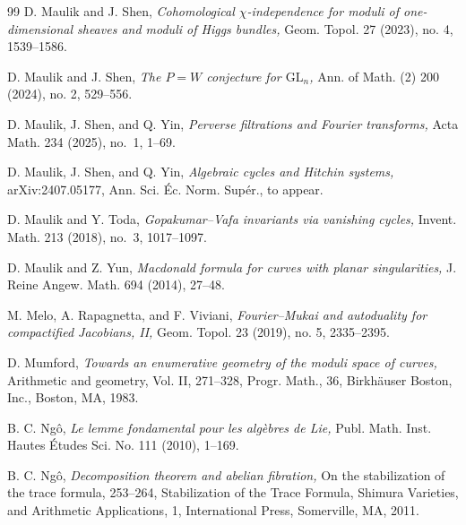 \documentclass[11pt]{amsart}
\theoremstyle{plain}
\theoremstyle{definition}
\theoremstyle{remark}
\begin{document}
\begin{thebibliography}{99}
 D. Maulik and J. Shen, {\em Cohomological $\chi$-independence for moduli of one-dimensional sheaves and moduli of Higgs bundles,} Geom. Topol. 27 (2023), no. 4, 1539--1586.

 D. Maulik and J. Shen, {\em The $P=W$ conjecture for $\mathrm{GL}_n$,} Ann. of Math. (2) 200 (2024), no. 2, 529--556.

 D. Maulik, J. Shen, and Q. Yin, {\em Perverse filtrations and Fourier transforms,} Acta Math. 234 (2025), no.~1, 1--69.

 D. Maulik, J. Shen, and Q. Yin, {\em Algebraic cycles and Hitchin systems,} arXiv:2407.05177, Ann. Sci. \'Ec. Norm. Sup\'er., to appear.

 D. Maulik and Y. Toda, {\em Gopakumar--Vafa invariants via vanishing cycles,} Invent. Math. 213 (2018), no.~3, 1017--1097.

 D. Maulik and Z. Yun, {\em Macdonald formula for curves with planar singularities,} J. Reine Angew. Math. 694 (2014), 27--48.



 M. Melo, A. Rapagnetta, and F. Viviani, {\em Fourier--Mukai and autoduality for compactified Jacobians, II,} Geom. Topol. 23 (2019), no. 5, 2335--2395.


 D. Mumford, {\em Towards an enumerative geometry of the moduli space of curves,} Arithmetic and geometry, Vol. II, 271--328, Progr. Math., 36, Birkh\"auser Boston, Inc., Boston, MA, 1983.

 B. C. Ng\^{o}, {\em Le lemme fondamental pour les alg\`{e}bres de Lie,} Publ. Math. Inst. Hautes \'Etudes Sci. No. 111 (2010), 1--169.

 B. C. Ng\^{o}, {\em Decomposition theorem and abelian fibration,} On the stabilization of the trace formula, 253--264, Stabilization of the Trace Formula, Shimura Varieties, and Arithmetic Applications, 1, International Press, Somerville, MA, 2011.


\end{thebibliography}
\end{document}
